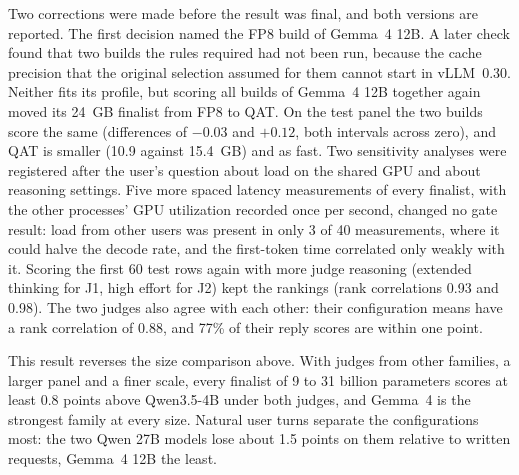 Two corrections were made before the result was final, and both versions are reported. The
first decision named the FP8 build of Gemma~4 12B. A later check found that two builds the
rules required had not been run, because the cache precision that the original selection
assumed for them cannot start in vLLM~0.30. Neither fits its profile, but scoring all builds of
Gemma~4 12B together again moved its 24~GB finalist from FP8 to QAT. On the test panel the two
builds score the same (differences of $-0.03$ and $+0.12$, both intervals across zero), and
QAT is smaller (10.9 against 15.4~GB) and as fast. Two sensitivity analyses were registered
after the user's question about load on the shared GPU and about reasoning settings. Five more
spaced latency measurements of every finalist, with the other processes' GPU utilization
recorded once per second, changed no gate result: load from other users was present in only
3 of 40 measurements, where it could halve the decode rate, and the first-token time correlated
only weakly with it. Scoring the first 60 test rows again with more judge reasoning (extended
thinking for J1, high effort for J2) kept the rankings (rank correlations 0.93 and 0.98).
The two judges also agree with each other: their configuration means have a rank correlation
of 0.88, and 77\% of their reply scores are within one point.

This result reverses the size comparison above. With judges from other families, a larger
panel and a finer scale, every finalist of 9 to 31 billion parameters scores at least 0.8
points above Qwen3.5-4B under both judges, and Gemma~4 is the strongest family at every size.
Natural user turns separate the configurations most: the two Qwen 27B models lose about 1.5
points on them relative to written requests, Gemma~4 12B the least.

